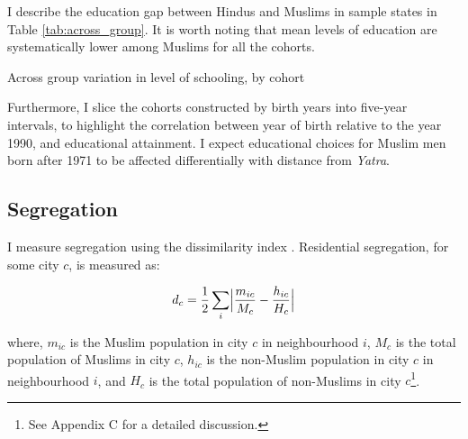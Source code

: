 \documentclass{article}
\begin{document}
I describe the education gap between Hindus and Muslims in sample states in Table \ref{tab:across_group}. It is worth noting that mean levels of education are systematically lower among Muslims for all the cohorts. 


\begin{table}[H]
\resizebox{\textwidth}{!}{

}
\caption{Across group variation in level of schooling, by cohort}
\label{tab:across_group}
\end{table}


Furthermore, I slice the cohorts constructed by birth years into five-year intervals, to highlight the correlation between year of birth relative to the year 1990, and educational attainment. I expect educational choices for Muslim men born after 1971 to be affected differentially with distance from \textit{Yatra}.

\subsection{Segregation}
I measure segregation using the dissimilarity index \citep{massey.2018}. Residential segregation, for some city $c$, is measured as:

\begin{equation}\label{eq:dis_index}
d_c = \frac{1}{2} \sum_i \Bigl|\frac{m_{ic}}{M_c} - \frac{h_{ic}}{H_c}\Bigr|
\end{equation}

where, $m_{ic}$ is the Muslim population in city $c$ in neighbourhood $i$, $M_c$ is the total population of Muslims in city $c$, $h_{ic}$ is the non-Muslim population in city $c$ in neighbourhood $i$, and $H_c$ is the total population of non-Muslims in city $c$\footnote{See Appendix C for a detailed discussion.}.
\end{document}
